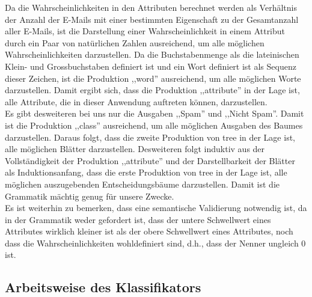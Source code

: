 \documentclass{article}
\begin{document}
Da die Wahrscheinlichkeiten in den Attributen berechnet werden als
Verh\"altnis der Anzahl der E-Mails mit einer bestimmten Eigenschaft
zu der Gesamtanzahl aller E-Mails, ist die Darstellung einer
Wahrscheinlichkeit in einem Attribut durch ein Paar von nat\"urlichen
Zahlen ausreichend, um alle m\"oglichen Wahrscheinlichkeiten darzustellen.
Da die Buchstabenmenge als die lateinischen Klein- und Grossbuchstaben
definiert ist und ein Wort definiert ist als Sequenz dieser Zeichen,
ist die Produktion ,,word''  ausreichend, um alle m\"oglichen Worte
darzustellen. Damit ergibt sich, dass die Produktion 
,,attribute'' in der Lage ist, alle Attribute, die in dieser
Anwendung auftreten k\"onnen, darzustellen.\\
Es gibt desweiteren bei uns nur die Ausgaben ,,Spam'' und ,,Nicht Spam''.
Damit ist die Produktion ,,class'' ausreichend, um alle 
m\"oglichen Ausgaben des Baumes darzustellen. Daraus folgt, dass die
zweite Produktion von tree in der Lage ist, alle m\"oglichen Bl\"atter
darzustellen. Desweiteren folgt induktiv aus der Vollst\"andigkeit der
Produktion ,,attribute'' und der Darstellbarkeit der Bl\"atter als
Induktionsanfang, dass die erste Produktion von tree in der Lage ist,
alle m\"oglichen auszugebenden Entscheidungsb\"aume darzustellen. Damit
ist die Grammatik m\"achtig genug f\"ur unsere Zwecke.\\
Es ist weiterhin zu bemerken, dass eine semantische Validierung notwendig
ist, da in der Grammatik weder gefordert ist, dass der untere Schwellwert
eines Attributes wirklich kleiner ist als der obere Schwellwert 
eines Attributes, noch dass die Wahrscheinlichkeiten wohldefiniert sind,
d.h., dass der Nenner ungleich 0 ist.
\subsection{Arbeitsweise des Klassifikators}
\end{document}
